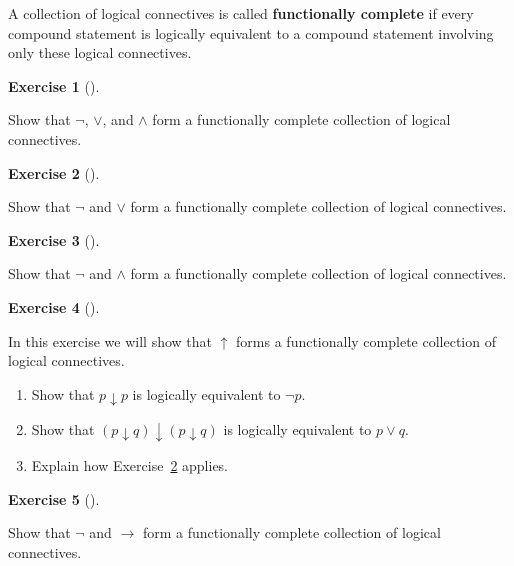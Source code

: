 \documentclass[
  letterpaper,
  10pt,
  reqno,
  twopage,
  openany]{book}
\providecommand{\tightlist}{%
  \setlength{\itemsep}{0pt}\setlength{\parskip}{0pt}}\usepackage{longtable,booktabs,array}
\theoremstyle{plain}
\theoremstyle{definition}
\newtheorem{exercise}{Exercise}[chapter]
\theoremstyle{definition}
\theoremstyle{definition}
\theoremstyle{plain}
\theoremstyle{plain}
\theoremstyle{remark}
\begin{document}
A collection of logical connectives is called
 \textbf{functionally complete} if every
compound statement is logically equivalent to a compound statement
involving only these logical connectives.

\leavevmode{}%
\begin{exercise}[]\label{exr-122}

Show that \(\neg\), \(\lor\), and \(\land\) form a functionally complete
collection of logical connectives.

\end{exercise}

\leavevmode{}%
\begin{exercise}[]\label{exr-fcor}

Show that \(\neg\) and \(\lor\) form a functionally complete collection
of logical connectives.

\end{exercise}

\leavevmode{}%
\begin{exercise}[]\label{exr-1-23}

Show that \(\neg\) and \(\land\) form a functionally complete collection
of logical connectives.

\end{exercise}

\leavevmode{}%
\begin{exercise}[]\label{exr-24}

In this exercise we will show that \(\uparrow\) forms a functionally
complete collection of logical connectives.

\begin{enumerate}
\def\labelenumi{\arabic{enumi}.}
\tightlist
\item
  Show that \(p\downarrow p\) is logically equivalent to \(\neg p\).
\item
  Show that \((p\downarrow q)\downarrow (p\downarrow q)\) is logically
  equivalent to \(p\lor q\).
\item
  Explain how Exercise~\ref{exr-fcor} applies.
\end{enumerate}

\end{exercise}

\leavevmode{}%
\begin{exercise}[]\label{exr-25}

Show that \(\neg\) and \(\rightarrow\) form a functionally complete
collection of logical connectives.

\end{exercise}
\end{document}
